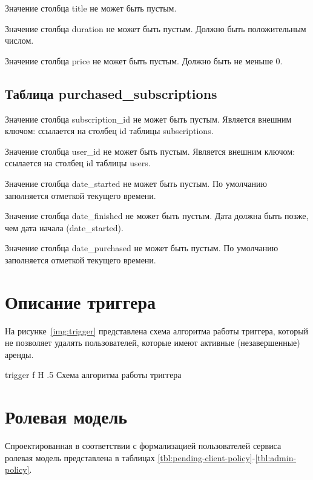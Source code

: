 Значение столбца title не может быть пустым.

Значение столбца duration не может быть пустым. Должно быть положительным числом.

Значение столбца price не может быть пустым. Должно быть не меньше 0.

\subsection{Таблица purchased\_subscriptions}

Значение столбца subscription\_id не может быть пустым. Является внешним ключом: ссылается на столбец id таблицы subscriptions.

Значение столбца user\_id не может быть пустым. Является внешним ключом: ссылается на столбец id таблицы users.

Значение столбца date\_started не может быть пустым. По умолчанию заполняется отметкой текущего времени.

Значение столбца date\_finished не может быть пустым. Дата должна быть позже, чем дата начала (date\_started).

Значение столбца date\_purchased не может быть пустым. По умолчанию заполняется отметкой текущего времени.

\section{Описание триггера}

На рисунке~\ref{img:trigger} представлена схема алгоритма работы триггера, который не позволяет удалять пользователей, которые имеют активные (незавершенные) аренды.

{trigger}
{f}
{H}
{.5\textwidth}
{Схема алгоритма работы триггера}

\section{Ролевая модель}

Спроектированная в соответствии с формализацией пользователей сервиса ролевая модель представлена в таблицах \ref{tbl:pending-client-policy}-\ref{tbl:admin-policy}.

